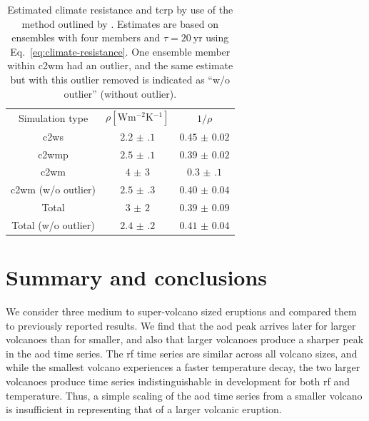 \documentclass{ametsocV6.1}
\begin{document}
\begin{table}
  \centering

  \caption{Estimated climate resistance and \gls{tcrp} by use of the method outlined by
    \citet{merlis2014}. Estimates are based on ensembles with four members and \(\tau
    =\SI{20}{\mathrm{yr}}\) using Eq.~\ref{eq:climate-resistance}. One ensemble member
    within \gls{c2wm} had an outlier, and the same estimate but with this outlier removed is
    indicated as ``w/o outlier'' (without outlier).}\label{tab:trcp}%
  \begin{tabular}{ccc}
    Simulation type          & \(\rho [\si{\watt\metre^{-2}\kelvin^{-1}}]\) & \(1/\rho\)        \\
    \gls{c2ws}               & \(\num{2.2(1)}\)                             & \(\num{0.45(2)}\) \\
    \gls{c2wmp}              & \(\num{2.5(1)}\)                             & \(\num{0.39(2)}\) \\
    \gls{c2wm}               & \(\num{4(3)}\)                               & \(\num{0.3(1)}\)  \\
    \gls{c2wm} (w/o outlier) & \(\num{2.5(3)}\)                             & \(\num{0.40(4)}\) \\
    Total                    & \(\num{3(2)}\)                               & \(\num{0.39(9)}\) \\
    Total (w/o outlier)      & \(\num{2.4(2)}\)                             & \(\num{0.41(4)}\) \\
  \end{tabular}
\end{table}


\section{Summary and conclusions}\label{sec:conclusions}

We consider three medium to super-volcano sized eruptions and compared them to
previously reported results. We find that the \gls{aod} peak arrives later for larger
volcanoes than for smaller, and also that larger volcanoes produce a sharper peak in the
\gls{aod} time series. The \gls{rf} time series are similar across all volcano sizes,
and while the smallest volcano experiences a faster temperature decay, the two larger
volcanoes produce time series indistinguishable in development for both \gls{rf} and
temperature. Thus, a simple scaling of the \gls{aod} time series from a smaller volcano
is insufficient in representing that of a larger volcanic eruption.
\end{document}
